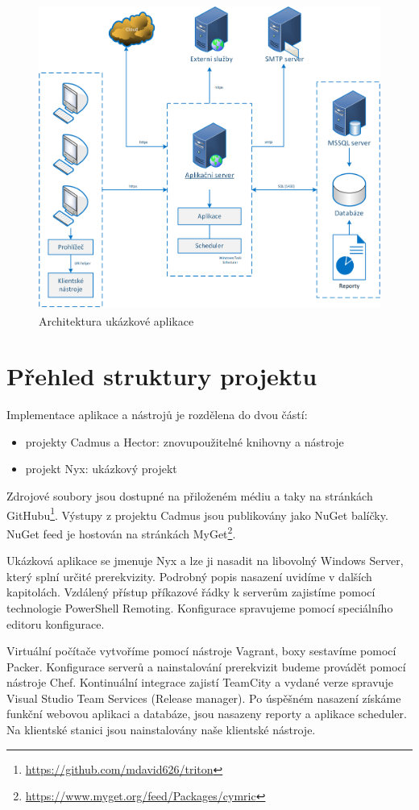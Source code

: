 \begin{figure}[]
  \centering
  \includegraphics[height=10cm]{fig/app_architektura.png}
  \caption{Architektura ukázkové aplikace}
  \label{fig:architektura}
\end{figure}

\section{Přehled struktury projektu}
Implementace aplikace a nástrojů je rozdělena do dvou částí:

\begin{itemize}
\item projekty Cadmus a Hector: znovupoužitelné knihovny a nástroje
\item projekt Nyx: ukázkový projekt
\end{itemize}

Zdrojové soubory jsou dostupné na přiloženém médiu a taky na stránkách GitHubu\footnote{\url{https://github.com/mdavid626/triton}}. Výstupy z projektu Cadmus jsou publikovány jako NuGet balíčky. NuGet feed je hostován na stránkách MyGet\footnote{\url{https://www.myget.org/feed/Packages/cymric}}. 

Ukázková aplikace se jmenuje Nyx a lze ji nasadit na libovolný Windows Server, který splní určité prerekvizity. Podrobný popis nasazení uvidíme v dalších kapitolách. Vzdálený přístup příkazové řádky k serverům zajistíme pomocí technologie PowerShell Remoting. Konfigurace spravujeme pomocí speciálního editoru konfigurace. 

Virtuální počítače vytvoříme pomocí nástroje Vagrant, boxy sestavíme pomocí Packer. Konfigurace serverů a nainstalování prerekvizit budeme provádět pomocí nástroje Chef. Kontinuální integrace zajistí TeamCity a vydané verze spravuje Visual Studio Team Services (Release manager). Po úspěšném nasazení získáme funkční webovou aplikaci a databáze, jsou nasazeny reporty a aplikace scheduler. Na klientské stanici jsou nainstalovány naše klientské nástroje. 

